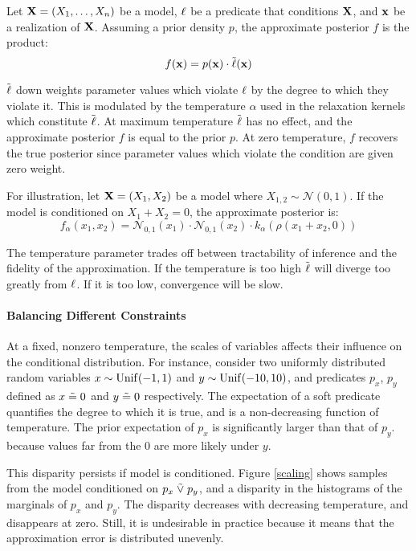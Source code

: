 \begin{definition}
Let $\mathbf{X} = (X_1, \dots, X_n)$ be a model, $\operatorname{\ell}$ be a predicate that conditions $\mathbf{X}$, and  $\mathbf{x}$ be a realization of $\mathbf{X}$.
Assuming a prior density $p$, the approximate posterior $f$ is the product:
\begin{equation}\label{fpm}
f(\mathbf{x}) = p(\mathbf{x}) \cdot \tilde{\operatorname{\ell}}(\mathbf{x})
  \end{equation}
\end{definition}
$\mathrel{\tilde{\operatorname{\ell}}}$ down weights parameter values which violate $\operatorname{\ell}$ by the degree to which they violate it. 
This is modulated by the temperature $\alpha$ used in the  relaxation kernels which constitute $\mathrel{\tilde{\operatorname{\ell}}}$.
At maximum temperature $\mathrel{\tilde{\operatorname{\ell}}}$ has no effect, and the approximate posterior $f$ is equal to the prior $p$.
At zero temperature, $f$ recovers the true posterior since parameter values which violate the condition are given zero weight.

For illustration, let $\mathbf{X} = (X_1, X_2)$ be a model where $X_{1,2} \sim \mathcal{N}(0, 1)$.
If the model is conditioned on $X_1 + X_2 = 0$, the approximate posterior is:
\begin{equation}\label{approxposterior}
f_\alpha(x_1, x_2) = \mathcal{N}_{0,1}(x_1) \cdot \mathcal{N}_{0,1}(x_2) \cdot k_\alpha(\rho(x_1 + x_2, 0)) 
\end{equation}

The temperature parameter trades off between tractability of inference and the fidelity of the approximation.
If the temperature is too high $\mathrel{\tilde{\operatorname{\ell}}}$ will diverge too greatly from $\operatorname{\ell}$. If it is too low, convergence will be slow.

\paragraph{Balancing Different Constraints}
At a fixed, nonzero temperature, the scales of variables affects their influence on
the conditional distribution.
For instance, consider two uniformly distributed random variables $x \sim \operatorname{Unif}(-1, 1)$ and $y \sim \operatorname{Unif}(-10, 10)$,
and predicates $p_x$, $p_y$ defined as $x \mathrel{\tilde{=}} 0$ and $y \mathrel{\tilde{=}} 0$ respectively.
The expectation of a soft predicate quantifies the degree to which it is true, and is a non-decreasing function of temperature.
The prior expectation of $p_x$ is significantly larger than that of $p_y$.
because values far from the 0 are more likely under $y$.

This disparity persists if model is conditioned.
Figure \ref{scaling} shows samples from the model conditioned on $p_x \mathrel{\tilde{\lor}} p_y$, and a disparity in the histograms of the marginals of $p_x$ and $p_y$.
The disparity decreases with decreasing temperature, and disappears at zero.
Still, it is undesirable in practice because it means that the approximation error is distributed unevenly.

